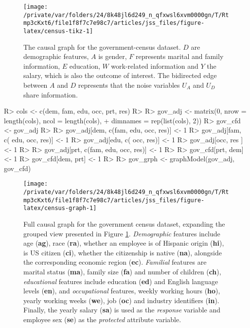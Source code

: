 \documentclass[
  nojss]{jss}
\begin{document}
\begin{CodeChunk}
\begin{figure}

{\centering \texttt{[image: /private/var/folders/24/8k48jl6d249\_n\_qfxwsl6xvm0000gn/T/Rtmp3cKxt6/file1f8f7c7e98c7/articles/jss\_files/figure-latex/census-tikz-1]} 

}

\caption[The causal graph for the government-census dataset]{The causal graph for the government-census dataset. $D$ are demographic features, $A$ is gender, $F$ represents marital and family information, $E$ education, $W$ work-related information and $Y$ the salary, which is also the outcome of interest. The bidirected edge between $A$ and $D$ represents that the noise variables $U_A$ and $U_D$ share information.}\label{fig:census-tikz}
\end{figure}
\end{CodeChunk}

\begin{CodeChunk}
\begin{CodeInput}
R> cols <- c(dem, fam, edu, occ, prt, res)
R> 
R> gov_adj <- matrix(0, nrow = length(cols), ncol = length(cols),
+                   dimnames = rep(list(cols), 2))
R> gov_cfd <- gov_adj
R> 
R> gov_adj[dem, c(fam, edu, occ, res)] <- 1
R> gov_adj[fam, c(     edu, occ, res)] <- 1
R> gov_adj[edu, c(          occ, res)] <- 1
R> gov_adj[occ,                  res ] <- 1
R> 
R> gov_adj[prt, c(fam, edu, occ, res)] <- 1
R> 
R> gov_cfd[prt, dem] <- 1
R> gov_cfd[dem, prt] <- 1
R> 
R> gov_grph <- graphModel(gov_adj, gov_cfd)
\end{CodeInput}
\end{CodeChunk}

\begin{CodeChunk}
\begin{figure}

{\centering \texttt{[image: /private/var/folders/24/8k48jl6d249\_n\_qfxwsl6xvm0000gn/T/Rtmp3cKxt6/file1f8f7c7e98c7/articles/jss\_files/figure-latex/census-graph-1]} 

}

\caption{Full causal graph for the government census dataset, expanding the grouped view presented in Figure \ref{fig:census-tikz}. \textit{Demographic} features include age (\textbf{ag}), race (\textbf{ra}), whether an employee is of Hispanic origin (\textbf{hi}), is US citizen (\textbf{ci}), whether the citizenship is native (\textbf{na}), alongside the corresponding economic region (\textbf{ec}). \textit{Familial} features are marital status (\textbf{ma}), family size (\textbf{fa}) and number of children (\textbf{ch}), \textit{educational} features include education (\textbf{ed}) and English language levels (\textbf{en}), and \textit{occupational} features, weekly working hours (\textbf{ho}), yearly working weeks (\textbf{we}), job (\textbf{oc}) and industry identifiers (\textbf{in}). Finally, the yearly salary (\textbf{sa}) is used as the \textit{response} variable and employee sex (\textbf{se}) as the \textit{protected} attribute variable.}\label{fig:census-graph}
\end{figure}
\end{CodeChunk}
\end{document}
